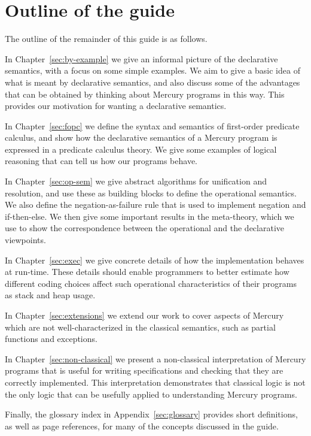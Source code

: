 \section{Outline of the guide}
\label{sec:outline}

The outline of the remainder of this guide is as follows.

In Chapter~\ref{sec:by-example} we give
an informal picture of the declarative semantics,
with a focus on some simple examples.
We aim to give a basic idea of
what is meant by declarative semantics,
and also discuss some of the advantages that can be obtained
by thinking about Mercury programs in this way.
This provides our motivation for
wanting a declarative semantics.

In Chapter~\ref{sec:fopc} we define
the syntax and semantics of first-order predicate calculus,
and show how the declarative semantics of a Mercury program
is expressed in a predicate calculus theory.
We give some examples of logical reasoning
that can tell us how our programs behave.

In Chapter~\ref{sec:op-sem}
we give abstract algorithms for unification and resolution,
and use these as building blocks to define the operational semantics.
We also define the negation-as-failure rule
that is used to implement negation and if-then-else.
We then give some important results in the meta-theory,
which we use to show the correspondence between
the operational and the declarative viewpoints.

In Chapter~\ref{sec:exec}
we give concrete details of how the implementation
behaves at run-time.
These details should enable programmers to better estimate
how different coding choices affect
such operational characteristics of their programs
as stack and heap usage.

In Chapter~\ref{sec:extensions} we extend our work to cover aspects of Mercury
which are not well-characterized in the classical semantics,
such as partial functions and exceptions.

In Chapter~\ref{sec:non-classical} we present
a non-classical interpretation of Mercury programs
that is useful for writing specifications
and checking that they are correctly implemented.
This interpretation demonstrates that
classical logic is not the only logic
that can be usefully applied to understanding Mercury programs.

Finally,
the glossary index in Appendix~\ref{sec:glossary}
provides short definitions,
as well as page references,
for many of the concepts discussed in the guide.
